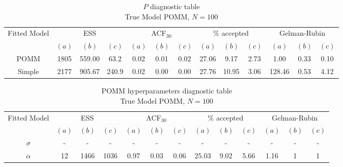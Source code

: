 \documentclass[11pt]{amsart}
\begin{document}
\begin{table}[htbp]
\centering
\caption*{
{\large $P$ diagnostic table} \\ 
{\small True Model POMM, $N=100$}
} 
\begin{tabular}{ccccccccccccc}
\toprule
\multirow{2}{*}{Fitted Model} & \multicolumn{3}{c}{ESS} & \multicolumn{3}{c}{
ACF$_{30}$} & \multicolumn{3}{c}{$\%$ accepted} & \multicolumn{3}{c}{Gelman-Rubin}\\
\cmidrule(lr){2-4} \cmidrule(lr){5-7} \cmidrule(lr){8-10} \cmidrule(lr){11-13} 
& $(a)$ & $(b)$ & $(c)$ & $(a)$ & $(b)$ & $(c)$ & $(a)$ & $(b)$ & $(c)$ & $(a)$ & $(b)$ & $(c)$ \\
\midrule
POMM &1805 & 559.00 & 63.2 & 0.02 & 0.01 & 0.02 & 27.06 & 9.17 & 2.73 & 1.00 & 0.33 & 0.10\\
Simple &2177 & 905.67 & 240.9 & 0.02 & 0.00 & 0.00 & 27.76 & 10.95 & 3.06 & 128.46 & 0.53 & 4.12\\
\bottomrule
\end{tabular}
\label{table:P_diagnostic_simple}
\end{table}


\begin{table}[htbp]
\centering
\caption*{
{\large POMM hyperparameters diagnostic table} \\ 
{\small True Model POMM, $N=100$}
} 
\begin{tabular}{ccccccccccccc}
\toprule
\multirow{2}{*}{Fitted Model} & \multicolumn{3}{c}{ESS} & \multicolumn{3}{c}{
ACF$_{30}$} & \multicolumn{3}{c}{$\%$ accepted} & \multicolumn{3}{c}{Gelman-Rubin}\\
\cmidrule(lr){2-4} \cmidrule(lr){5-7} \cmidrule(lr){8-10} \cmidrule(lr){11-13} 
& $(a)$ & $(b)$ & $(c)$ & $(a)$ & $(b)$ & $(c)$ & $(a)$ & $(b)$ & $(c)$ & $(a)$ & $(b)$ & $(c)$ \\
\midrule
$\sigma$ &- & - & - & - & - & - & - & - & - & -& - & - \\
$\alpha$ &12 & 1466 & 1036 & 0.97 & 0.03 & 0.06 & 25.03 & 9.02 & 5.66 & 1.16 & 1 & 1     \\
\bottomrule
\end{tabular}
\label{table:simulations_from_simple}
\end{table}

\clearpage
\end{document}
